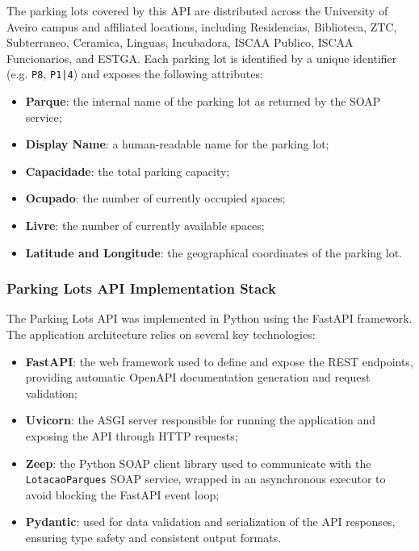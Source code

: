 \documentclass[12pt, a4paper]{report}
\begin{document}
The parking lots covered by this API are distributed across the University of Aveiro campus
and affiliated locations, including Residencias, Biblioteca, ZTC, Subterraneo, Ceramica,
Linguas, Incubadora, ISCAA Publico, ISCAA Funcionarios, and ESTGA. Each parking lot is
identified by a unique identifier (e.g. \texttt{P8}, \texttt{P1|4}) and exposes the following
attributes:

\begin{itemize}
      \item \textbf{Parque}: the internal name of the parking lot as returned by the SOAP service;
      \item \textbf{Display Name}: a human-readable name for the parking lot;
      \item \textbf{Capacidade}: the total parking capacity;
      \item \textbf{Ocupado}: the number of currently occupied spaces;
      \item \textbf{Livre}: the number of currently available spaces;
      \item \textbf{Latitude and Longitude}: the geographical coordinates of the parking lot.
\end{itemize}

\subsubsection{Parking Lots API Implementation Stack}
The Parking Lots API was implemented in Python using the FastAPI framework. The application
architecture relies on several key technologies:

\begin{itemize}
    \item \textbf{FastAPI}: the web framework used to define and expose the REST endpoints,
          providing automatic OpenAPI documentation generation and request validation;
    \item \textbf{Uvicorn}: the ASGI server responsible for running the application and
          exposing the API through HTTP requests;
    \item \textbf{Zeep}: the Python SOAP client library used to communicate with the
          \texttt{Lotacao\allowbreak Parques} SOAP service, wrapped in an asynchronous executor to avoid
          blocking the FastAPI event loop;
    \item \textbf{Pydantic}: used for data validation and serialization of the API responses,
          ensuring type safety and consistent output formats.
\end{itemize}
\end{document}
